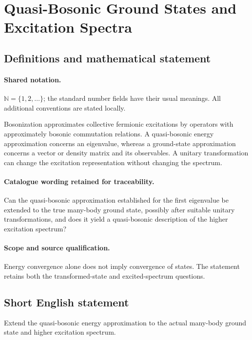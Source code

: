 \documentclass[11pt]{article}
\begin{document}
\section{Quasi-Bosonic Ground States and Excitation Spectra}\label{statement}

\subsection{Definitions and mathematical statement}

\paragraph{Shared notation.}$\mathbb N=\{1,2,\ldots\}$; the standard number fields have their usual meanings. All additional conventions are stated locally.


Bosonization approximates collective fermionic excitations by operators with approximately bosonic commutation relations. A quasi-bosonic energy approximation concerns an eigenvalue, whereas a ground-state approximation concerns a vector or density matrix and its observables. A unitary transformation can change the excitation representation without changing the spectrum.

\paragraph{Catalogue wording retained for traceability.}
Can the quasi-bosonic approximation established for the first eigenvalue be extended to the true many-body ground state, possibly after suitable unitary transformations, and does it yield a quasi-bosonic description of the higher excitation spectrum?

\paragraph{Scope and source qualification.}Energy convergence alone does not imply convergence of states. The statement retains both the transformed-state and excited-spectrum questions.
\subsection{Short English statement}
Extend the quasi-bosonic energy approximation to the actual many-body ground state and higher excitation spectrum.
\end{document}
